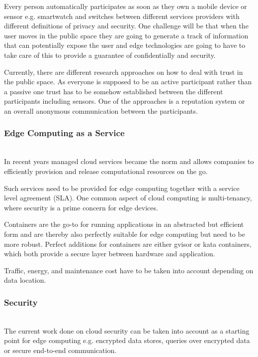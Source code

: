 Every person automatically participates as soon as they own a mobile device or sensor e.g. smartwatch and switches between different services providers with different definitions of privacy and security.
One challenge will be that when the user moves in the public space they are going to generate a track of information that can potentially expose the user and edge technologies are going to have to take care of this to provide a guarantee of confidentially and security.

Currently, there are different research approaches on how to deal with trust in the public space. As everyone is supposed to be an active participant rather than a passive one trust has to be somehow established between the different participants including sensors.
One of the approaches is a reputation system or an overall anonymous communication between the participants.

\subsubsection{Edge Computing as a Service}\hspace*{\fill} \\
In recent years managed cloud services became the norm and allows companies to efficiently provision and release computational resources on the go.

Such services need to be provided for edge computing together with a service level agreement (SLA).
One common aspect of cloud computing is multi-tenancy, where security is a prime concern for edge devices.

Containers are the go-to for running applications in an abstracted but efficient form and are thereby also perfectly suitable for edge computing but need to be more robust. Perfect additions for containers are either gvisor or kata containers, which both provide a secure layer between hardware and application.

Traffic, energy, and maintenance cost have to be taken into account depending on data location.

\subsubsection{Security}\hspace*{\fill} \\
The current work done on cloud security can be taken into account as a starting point for edge computing e.g. encrypted data stores, queries over encrypted data or secure end-to-end communication.

